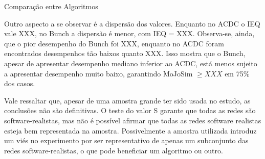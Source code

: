 \begin{section}{Comparação entre Algoritmos}

Outro aspecto a se observar é a dispersão dos valores. Enquanto no ACDC o IEQ vale XXX, no Bunch a dispersão é menor, com IEQ = XXX. Observa-se, ainda, que o pior desempenho do Bunch foi XXX, enquanto no ACDC foram encontrados desempenhos tão baixos quanto XXX. Isso mostra que o Bunch, apesar de apresentar desempenho mediano inferior ao ACDC, está menos sujeito a apresentar desempenho muito baixo, garantindo MoJoSim $\ge XXX$ em 75\% dos casos.

Vale ressaltar que, apesar de uma amostra grande ter sido usada no estudo, as conclusões não são definitivas. O teste do valor S garante que todas as redes são software-realistas, mas não é possível afirmar que todas as redes software realistas esteja bem representada na amostra. Possivelmente a amostra utilizada introduz um viés no experimento por ser representativo de apenas um subconjunto das redes software-realistas, o que pode beneficiar um algoritmo ou outro.

\end{section}

